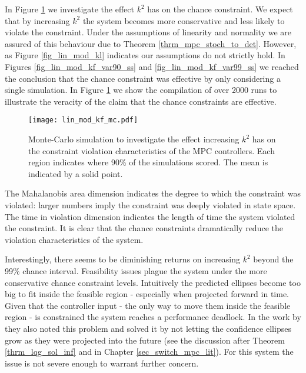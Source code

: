 In Figure \ref{fig_lin_mod_kf_mc} we investigate the effect $k^2$ has on the chance constraint. We expect that by increasing $k^2$ the system becomes more conservative and less likely to violate the constraint. Under the assumptions of linearity and normality we are assured of this behaviour due to Theorem \ref{thrm_mpc_stoch_to_det}. However, as Figure \ref{fig_lin_mod_kl} indicates our assumptions do not  strictly hold. In Figures \ref{fig_lin_mod_kf_var90_ss} and \ref{fig_lin_mod_kf_var99_ss} we reached the conclusion that the chance constraint was effective by only considering a single simulation. In Figure \ref{fig_lin_mod_kf_mc} we show the compilation of over 2000 runs to illustrate the veracity of the claim that the chance constraints are effective.
\begin{figure}[H] 
\centering
\texttt{[image: lin\_mod\_kf\_mc.pdf]}
\caption{Monte-Carlo simulation to investigate the effect increasing $k^2$ has on the constraint violation characteristics of the MPC controllers. Each region indicates where 90\% of the simulations scored. The mean is indicated by a solid point.}
\label{fig_lin_mod_kf_mc}
\end{figure}
The Mahalanobis area dimension indicates the degree to which the constraint was violated: larger numbers imply the constraint was deeply violated in state space. The time in violation dimension indicates the length of time the system violated the constraint. It is clear that the chance constraints dramatically reduce the violation characteristics of the system. 

Interestingly, there seems to be diminishing returns on increasing $k^2$ beyond the 99\% chance interval. Feasibility issues plague the system under the more conservative chance constraint levels. Intuitively the predicted ellipses become too big to fit inside the feasible region - especially when projected forward in time. Given that the controller input - the only way to move them inside the feasible region - is constrained the system reaches a performance deadlock. In the work by \cite{yan1} they also noted this problem and solved it by not letting the confidence ellipses grow as they were projected into the future (see the discussion after Theorem \ref{thrm_lqg_sol_inf} and in Chapter \ref{sec_switch_mpc_lit}). For this system the issue is not severe enough to warrant further concern.   

